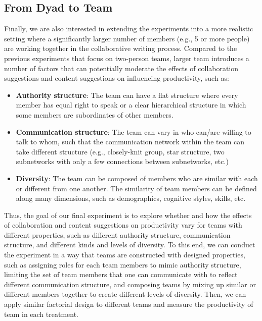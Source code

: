 \subsection{From Dyad to Team}
\label{sec:exp4}
Finally, we are also interested in extending the experiments into a more realistic setting where a significantly larger number of members (e.g., 5 or more people) are working together in the collaborative writing process. Compared to the previous experiments that focus on two-person teams, larger team introduces a number of factors that can potentially moderate the effects of collaboration suggestions and content suggestions on influencing productivity, such as:
\begin{itemize}
\item{\bf Authority structure}: The team can have a flat structure where every member has equal right to speak or a clear hierarchical structure in which some members are subordinates of other members.
\item{\bf Communication structure}: The team can vary in who can/are willing to talk to whom, such that the communication network within the team can take different structure (e.g., closely-knit group, star structure, two subnetworks with only a few connections between subnetworks, etc.) 
\item{\bf Diversity}: The team can be composed of members who are similar with each or different from one another. The similarity of team members can be defined along many dimensions, such as demographics, cognitive styles, skills, etc.
\end{itemize}

Thus, the goal of our final experiment is to explore whether and how the effects of collaboration and content suggestions on productivity vary for teams with different properties, such as different authority structure, communication structure, and different kinds and levels of diversity. To this end, we can conduct the experiment in a way that teams are constructed with designed properties, such as assigning roles for each team members to mimic authority structure, limiting the set of team members that one can communicate with to reflect different communication structure, and composing teams by mixing up similar or different members together to create different levels of diversity. Then, we can apply similar factorial design to different teams and measure the productivity of team in each treatment.